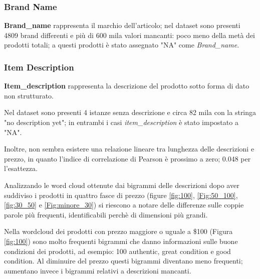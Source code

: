 \subsubsection{Brand Name}
\textbf{Brand\_name} rappresenta il marchio dell'articolo; nel dataset sono
presenti 4809 brand differenti e più di 600 mila valori mancanti: poco meno
della metà dei prodotti totali; a questi prodotti è stato assegnato "NA" come \textit{Brand\_name}.
\subsubsection{Item Description}
\textbf{Item\_description} rappresenta la descrizione del prodotto sotto forma
di dato non strutturato.

Nel dataset sono presenti 4 istanze senza descrizione e
circa 82 mila con la stringa "no description yet"; in entrambi i casi
\textit{item\_description} è stato impostato a "NA".

Inoltre, non sembra esistere una relazione lineare tra lunghezza delle
descrizioni e prezzo, in quanto l'indice di correlazione di Pearson è prossimo a
zero; 0.048 per l'esattezza.

Analizzando le word cloud ottenute dai bigrammi delle descrizioni dopo aver
suddiviso i prodotti in quattro fasce di prezzo (figure \ref{fig:100},
\ref{Fig:50_100}, \ref{fig:30_50} e \ref{Fig:minore_30}) si riescono a notare
delle differenze sulle coppie parole più frequenti, identificabili perchè di
dimensioni più grandi.

Nella wordcloud dei prodotti con prezzo maggiore o uguale a \$100 (Figura
\ref{fig:100}) sono molto frequenti bigrammi che danno informazioni sulle buone
condizioni dei prodotti, ad esempio: 100 authentic, great condition e good
condition. Al diminuire del prezzo questi bigrammi diventano meno frequenti;
aumentano invece i bigrammi relativi a descrizioni mancanti.


